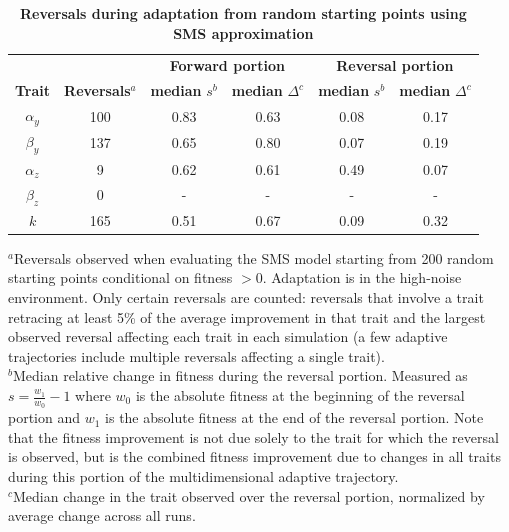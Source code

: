 \documentclass[pdftex,12pt,titlepage]{article}
\begin{document}
\setlength{\parindent}{1cm}
\begin{table}[p]
\caption{\textbf{Reversals during adaptation from random starting points using SMS approximation}}\label{smsTable}
\vspace{0.3cm}
\begin{center}
\begin{tabular}{c|c|c|c|c|c}
\hline
\hline
  & & \multicolumn{2}{c|}{\textbf{Forward portion}} & \multicolumn{2}{c}{\textbf{Reversal portion}} \\
\cline{3-6}
\textbf{Trait} & \textbf{Reversals}$^{a}$ 
  & \textbf{median} $s^{b}$ & \textbf{median} $\Delta^c$ 
  & \textbf{median} $s^{b}$ & \textbf{median} $\Delta^c$ \\
\hline
\hline
$\alpha_y$ & 100 & 0.83 & 0.63 & 0.08 & 0.17 \\ 
$\beta_y$  & 137 & 0.65 & 0.80 & 0.07 & 0.19 \\ 
$\alpha_z$ &   9 & 0.62 & 0.61 & 0.49 & 0.07 \\ 
$\beta_z$  &   0 &    - &    - &    - &    - \\ 
$k$        & 165 & 0.51 & 0.67 & 0.09 & 0.32 \\ 
\hline
\end{tabular}
\end{center}
\vspace{0.2cm}
$^{a}$\small{Reversals observed when evaluating the SMS model starting from 200 random starting points conditional on fitness $> 0$. Adaptation is in the high-noise environment. Only certain reversals are counted: reversals that involve a trait retracing at least 5\% of the average improvement in that trait and the largest observed reversal affecting each trait in each simulation (a few adaptive trajectories include multiple reversals affecting a single trait).}\\
$^{b}$\small{Median relative change in fitness during the reversal portion. Measured as $s = \frac{w_1}{w_0} - 1$ where $w_0$ is the absolute fitness at the beginning of the reversal portion and $w_1$ is the absolute fitness at the end of the reversal portion. Note that the fitness improvement is not due solely to the trait for which the reversal is observed, but is the combined fitness improvement due to changes in all traits during this portion of the multidimensional adaptive trajectory.}\\
$^{c}$\small{Median change in the trait observed over the reversal portion, normalized by average change across all runs.}\\
\end{table}
\clearpage
\end{document}
